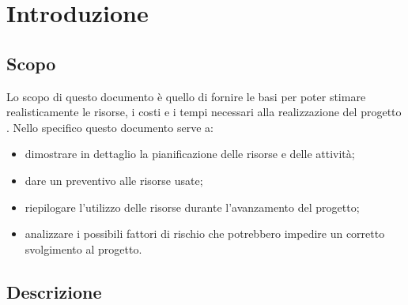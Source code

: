 \documentclass[12pt,a4paper]{article}
\begin{document}
\newpage
\tableofcontents
\newpage
\listoftables
\newpage
\listoffigures
\newpage

\section{Introduzione} 

\subsection{Scopo}
Lo scopo di questo documento è quello di fornire le basi per poter stimare realisticamente le risorse, i costi e i tempi necessari alla realizzazione del progetto \textit{\prjL{}}. Nello specifico questo documento serve a:
\begin{itemize}
	\item dimostrare in dettaglio la pianificazione delle risorse e delle attività;
	\item dare un preventivo alle risorse usate;
	\item riepilogare l'utilizzo delle risorse durante l'avanzamento del progetto;
	\item analizzare i possibili fattori di rischio che potrebbero impedire un corretto svolgimento al progetto.
\end{itemize}

\subsection{Descrizione}
\end{document}
